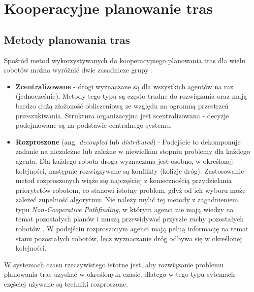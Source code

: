 \chapter{Kooperacyjne planowanie tras}
\label{ch:cooperative_pathfinding}

\section{Metody planowania tras}
Spośród metod wykorzystywanych do kooperacyjnego planowania tras dla wielu robotów można wyróżnić dwie zasadnicze grupy \cite{latombe}:
\begin{itemize}
	\item {\bf Zcentralizowane} - drogi wyznaczane są dla wszystkich agentów na raz (jednocześnie). Metody tego typu są często trudne do rozwiązania oraz mają bardzo dużą złożoność obliczeniową ze względu na ogromną przestrzeń przeszukiwania. Struktura organizacyjna jest scentralizowana - decyzje podejmowane są na podstawie centralnego systemu.
	\item {\bf Rozproszone} (ang. {\it decoupled} lub {\it distributed}) - Podejście to dekomponuje zadanie na niezależne lub zależne w niewielkim stopniu problemy dla każdego agenta. Dla każdego robota droga wyznaczana jest osobno, w określonej kolejności, następnie rozwiązywane są konflikty (kolizje dróg).
	Zastosowanie metod rozproszonych wiąże się najczęściej z koniecznością przydzielania priorytetów robotom, co stanowi istotny problem, gdyż od ich wyboru może zależeć zupełność algorytmu. Nie należy mylić tej metody z zagadnieniem typu {\it Non-Cooperative Pathfinding}, w którym agenci nie mają wiedzy na temat pozostałych planów i muszą przewidywać przyszłe ruchy pozostałych robotów \cite{cooppath}. W podejściu rozproszonym agenci mają pełną informację na temat stanu pozostałych robotów, lecz wyznaczanie dróg odbywa się w określonej kolejności.
\end{itemize}

W systemach czasu rzeczywistego istotne jest, aby rozwiązanie problemu planowania tras uzyskać w określonym czasie, dlatego w tego typu sytemach częściej używane są techniki rozproszone.

